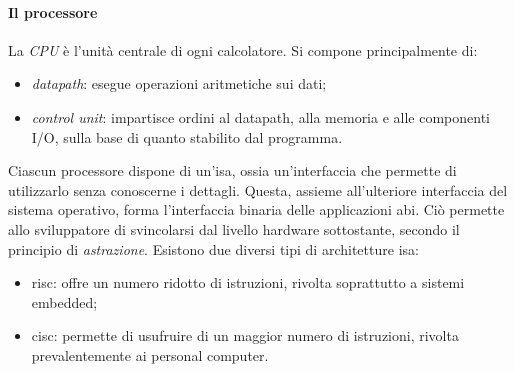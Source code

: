 \paragraph*{Il processore}
La \emph{CPU} è l'unità centrale di ogni calcolatore. Si compone principalmente di:
\begin{itemize}
	\item \emph{datapath}: esegue operazioni aritmetiche sui dati;
	\item \emph{control unit}: impartisce ordini al datapath, alla memoria e alle componenti I/O, sulla base di quanto stabilito dal programma.
\end{itemize}
Ciascun processore dispone di un'\acrfull{isa}, ossia un'interfaccia che permette di utilizzarlo senza conoscerne i dettagli.
Questa, assieme all'ulteriore interfaccia del sistema operativo, forma l'interfaccia binaria delle applicazioni \acrfull{abi}.
Ciò permette allo sviluppatore di svincolarsi dal livello hardware sottostante, secondo il principio di \emph{astrazione}. Esistono due diversi tipi di architetture \acrshort{isa}:
\begin{itemize}
	\item \acrshort{risc}: offre un numero ridotto di istruzioni, rivolta soprattutto a sistemi embedded;
	\item \acrshort{cisc}: permette di usufruire di un maggior numero di istruzioni, rivolta prevalentemente ai personal computer.
\end{itemize}

